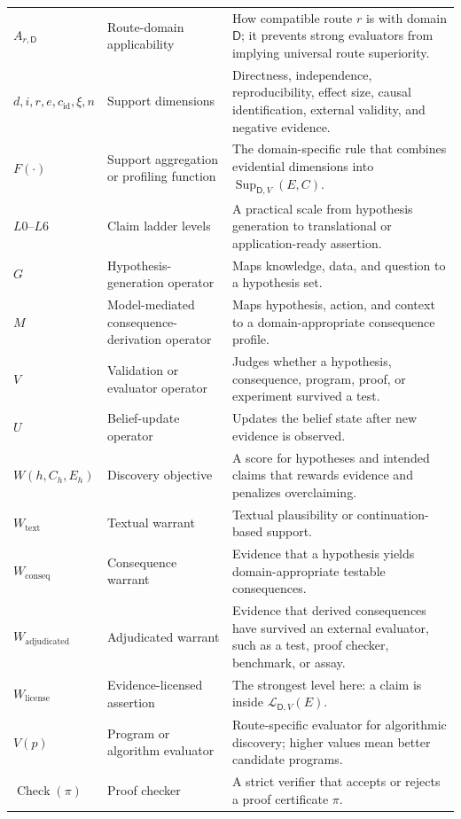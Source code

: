 \documentclass[11pt,a4paper]{article}
\newcommand{\Sup}{\operatorname{Sup}}
\newcommand{\Dom}{\mathsf{D}}
\begin{document}
{\begin{longtable}{@{}p{2.8cm}p{4.1cm}p{6.4cm}@{}}
$A_{r,\Dom}$ & Route-domain applicability & How compatible route $r$ is with domain $\Dom$; it prevents strong evaluators from implying universal route superiority. \\
$d,i,r,e,c_{\mathrm{id}},\xi,n$ & Support dimensions & Directness, independence, reproducibility, effect size, causal identification, external validity, and negative evidence. \\
$F(\cdot)$ & Support aggregation or profiling function & The domain-specific rule that combines evidential dimensions into $\Sup_{\Dom,V}(E,C)$. \\
$L0$--$L6$ & Claim ladder levels & A practical scale from hypothesis generation to translational or application-ready assertion. \\
$G$ & Hypothesis-generation operator & Maps knowledge, data, and question to a hypothesis set. \\
$M$ & Model-mediated consequence-derivation operator & Maps hypothesis, action, and context to a domain-appropriate consequence profile. \\
$V$ & Validation or evaluator operator & Judges whether a hypothesis, consequence, program, proof, or experiment survived a test. \\
$U$ & Belief-update operator & Updates the belief state after new evidence is observed. \\
$W(h,C_h,E_h)$ & Discovery objective & A score for hypotheses and intended claims that rewards evidence and penalizes overclaiming. \\
$W_{\mathrm{text}}$ & Textual warrant & Textual plausibility or continuation-based support. \\
$W_{\mathrm{conseq}}$ & Consequence warrant & Evidence that a hypothesis yields domain-appropriate testable consequences. \\
$W_{\mathrm{adjudicated}}$ & Adjudicated warrant & Evidence that derived consequences have survived an external evaluator, such as a test, proof checker, benchmark, or assay. \\
$W_{\mathrm{license}}$ & Evidence-licensed assertion & The strongest level here: a claim is inside $\mathcal{L}_{\Dom,V}(E)$. \\
$V(p)$ & Program or algorithm evaluator & Route-specific evaluator for algorithmic discovery; higher values mean better candidate programs. \\
$\operatorname{Check}(\pi)$ & Proof checker & A strict verifier that accepts or rejects a proof certificate $\pi$. \\

\end{longtable}}
\end{document}
